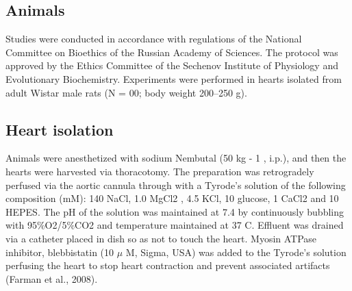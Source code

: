 \documentclass[a4paper,12pt]{article}
\begin{document}
\subsection{Animals}

Studies were conducted in accordance with regulations of the National Committee on Bioethics of the Russian Academy of Sciences.
The protocol was approved by the Ethics Committee of the Sechenov Institute of Physiology and Evolutionary Biochemistry.
Experiments were performed in hearts isolated from adult Wistar male rats (N = 00; body weight 200–250 g).

\subsection{Heart isolation}
Animals were anesthetized with sodium Nembutal (50 kg - 1 , i.p.), and then the hearts were harvested via thoracotomy.
The preparation was retrogradely perfused via the aortic cannula through with a Tyrode’s solution of the following composition (mM): 140 NaCl, 1.0 MgCl2 , 4.5 KCl, 10 glucose, 1 CaCl2 and 10 HEPES.
The pH of the solution was maintained at 7.4 by continuously bubbling with 95\%O2/5\%CO2 and temperature maintained at 37 C.
Effluent was drained via a catheter placed in dish so as not to touch the heart. Myosin ATPase inhibitor, blebbistatin (10 $\mu$ M, Sigma, USA) was added to the Tyrode’s solution perfusing the heart to stop heart contraction and prevent associated artifacts (Farman et al., 2008).
\end{document}
